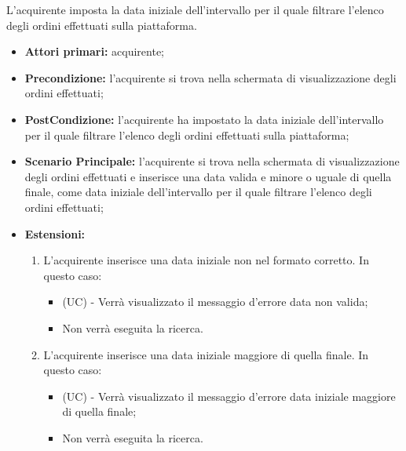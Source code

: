 L'acquirente imposta la data iniziale dell'intervallo per il quale filtrare l'elenco degli ordini effettuati sulla piattaforma.
\begin{itemize}
    \item \textbf{Attori primari:} acquirente;
    \item \textbf{Precondizione:} l'acquirente si trova nella schermata di visualizzazione degli ordini effettuati;
    \item \textbf{PostCondizione:} l'acquirente ha impostato la data iniziale dell'intervallo per il quale filtrare l'elenco degli ordini effettuati sulla piattaforma;
    \item \textbf{Scenario Principale:} l'acquirente si trova nella schermata di visualizzazione degli ordini effettuati e inserisce una data valida e minore o uguale di quella finale, come data iniziale dell'intervallo per il quale filtrare l'elenco degli ordini effettuati;
    \item \textbf{Estensioni:}
    \begin{enumerate}[label=\lett]
        \item L'acquirente inserisce una data iniziale non nel formato corretto. In questo caso:
        \begin{itemize}
            \item (UC) - Verrà visualizzato il messaggio d'errore data non valida;
            \item Non verrà eseguita la ricerca.
        \end{itemize} 
        \item L'acquirente inserisce una data iniziale maggiore di quella finale. In questo caso:
        \begin{itemize}
            \item (UC) - Verrà visualizzato il messaggio d'errore data iniziale maggiore di quella finale;
            \item Non verrà eseguita la ricerca.
        \end{itemize}
    \end{enumerate}
\end{itemize}

